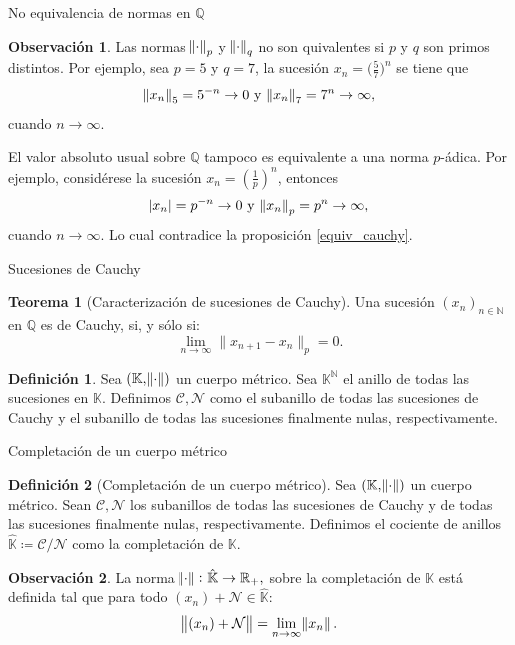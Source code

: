 \documentclass{beamer}
\newcommand{\bb}[1]{\mathbb{#1}}
\theoremstyle{definition}
\numberwithin{equation}{section}
\newcommand{\marine}[1]{\textcolor{defColor}{#1}}
\newcommand{\orangee}[1]{\textcolor{thColor}{#1}}
\newcommand{\redd}[1]{\textcolor{rkColor}{#1}}
\newtheorem{df}{\marine{Definición}}
\newtheorem{thh}{\orangee{Teorema}}
\newtheorem{rr}{\redd{Observación}}
\newcommand{\N}{\mathbb{N}}
\newcommand{\R}{\mathbb{R}}
\newcommand{\Q}{\mathbb{Q}}
\newcommand{\pnorm}[1]{\|#1\|_p}
\begin{document}
\begin{frame}{No equivalencia de normas en $\Q$}
	\begin{rr}
			Las normas $\norm{\cdot}_p$ y $\norm{\cdot}_q$ no son quivalentes si $p$ y $q$ son primos distintos. Por ejemplo, sea $p=5$ y $q=7$, la sucesión 
		$x_n=\big (\frac{5}{7}\big)^n$ se tiene que 
		$$\norm{x_n}_5=5^{-n}\rightarrow 0 \text{ y } \norm{x_n}_7=7^{n}\rightarrow \infty ,$$
		cuando $n \rightarrow \infty$.
		
		El valor absoluto usual sobre $\Q$ tampoco es equivalente a una norma $p$-ádica. Por ejemplo, considérese la sucesión $x_n= (\frac{1}{p})^n$, entonces
		$$\abs{x_n}=p^{-n}\to 0 \text{ y } \norm{x_n}_p = p^n \to \infty,$$
		cuando $n\to\infty$. Lo cual contradice la proposición \ref{equiv_cauchy}.
	\end{rr}
\end{frame}
\begin{frame}{Sucesiones de Cauchy}
\begin{thh}
	[Caracterización de sucesiones de Cauchy]\label{car}
	Una sucesión $ (x_n)_{n\in\N}$ en $\Q$ es de Cauchy, si, y sólo si:
	\begin{equation}\label{car_cau}
	\lim_{n\to\infty}\pnorm{x_{n+1}-x_n}=0.
	\end{equation}
\end{thh}
\begin{df}
	Sea $ (\bb{K}, \norm{\cdot})$ un cuerpo métrico. Sea ${\bb{K}^\N}$ el anillo de todas las sucesiones en $\bb{K}$. Definimos $\mathcal C,\mathcal N $ como el subanillo de todas las sucesiones de Cauchy y el subanillo de todas las sucesiones finalmente nulas, respectivamente.
\end{df}
\end{frame}
\begin{frame}{Completación de un cuerpo métrico}
\begin{df}
	[Completación de un cuerpo métrico]Sea $ (\bb{K}, \norm{\cdot})$ un cuerpo métrico. Sean $\mathcal C,\mathcal N $ los subanillos de todas las sucesiones de Cauchy y de todas las sucesiones finalmente nulas, respectivamente.  Definimos el cociente de anillos $\hat{\bb{K}}\coloneqq \mathcal C/\mathcal N  $ como la completación de $\bb{K}$.
\end{df}
\begin{rr}
	La norma $\norm{\cdot}\colon{\hat{\bb{K}}}\to\R_+,$ sobre la completación de $\bb{K}$ está definida tal que para todo $ (x_n)+\mathcal{N} \in \hat{\bb{K}}$:
	$$\norm{ (x_n)+\mathcal{N}}=\lim_{n\to\infty}\norm{x_n}.$$
\end{rr}
\end{frame}
\end{document}
